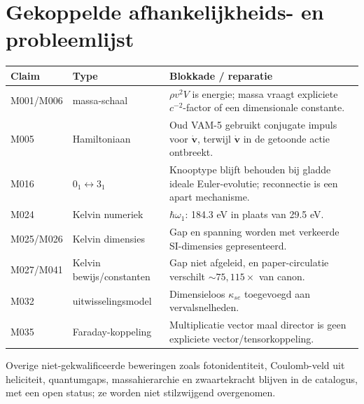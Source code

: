 \documentclass[10pt,a4paper]{article}
\begin{document}
\section{Gekoppelde afhankelijkheids- en probleemlijst}
\small
\begin{longtable}{p{}p{}p{}}
\toprule
Claim & Type & Blokkade / repara\-tie \\
\midrule
\endhead
M001/M006 & massa-schaal & \(\rho v^2V\) is energie; massa vraagt expliciete \(c^{-2}\)-factor of een dimensionale constante. \\
M005 & Hamiltoniaan & Oud VAM-5 gebruikt conjugate impuls voor \(\dot{\mathbf v}\), terwijl \(\dot{\mathbf v}\) in de getoonde actie ontbreekt. \\
M016 & \(0_1\leftrightarrow3_1\) & Knooptype blijft behouden bij gladde ideale Euler-evolutie; reconnectie is een apart mechanisme. \\
M024 & Kelvin numeriek & \(\hbar\omega_1\): 184.3 eV in plaats van 29.5 eV. \\
M025/M026 & Kelvin dimensies & Gap en spanning worden met verkeerde SI-dimensies gepresenteerd. \\
M027/M041 & Kelvin bewijs/constanten & Gap niet afgeleid, en paper-circulatie verschilt \(\sim75{,}115\times\) van canon. \\
M032 & uitwisselingsmodel & Dimensieloos \(\kappa_{se}\) toegevoegd aan vervalsnelheden. \\
M035 & Faraday-koppeling & Multiplicatie vector maal director is geen expliciete vector/tensorkoppeling. \\
\bottomrule
\end{longtable}
\normalsize
Overige niet-gekwalificeerde beweringen zoals fotonidentiteit, Coulomb-veld uit heliciteit, quantumgaps, massahierarchie en zwaartekracht blijven in de catalogus, met een open status; ze worden niet stilzwijgend overgenomen.
\end{document}
